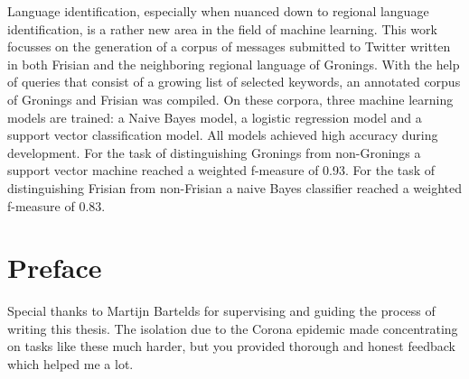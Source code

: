 \documentclass[
10pt, %
a4paper, %
oneside, %
headinclude,footinclude, %
] {book}%
\begin{document}
Language identification, especially when nuanced down to regional language identification, is a rather new area in the field of machine learning. This work focusses on the generation of a corpus of messages submitted to Twitter written in both Frisian and the neighboring regional language of Gronings. With the help of queries that consist of a growing list of selected keywords, an annotated corpus of Gronings and Frisian was compiled. On these corpora, three machine learning models are trained: a Naive Bayes model, a logistic regression model and a support vector classification model. All models achieved high accuracy during development. For the task of distinguishing Gronings from non-Gronings a support vector machine reached a weighted f-measure of 0.93. For the task of distinguishing Frisian from non-Frisian a naive Bayes classifier reached a weighted f-measure of 0.83.
\clearpage
\setcounter{tocdepth}{3} %
\tableofcontents %








\chapter*{Preface}

Special thanks to Martijn Bartelds for supervising and guiding the process of writing this thesis. The isolation due to the Corona epidemic made concentrating on tasks like these much harder, but you provided thorough and honest feedback which helped me a lot.





\end{document}
